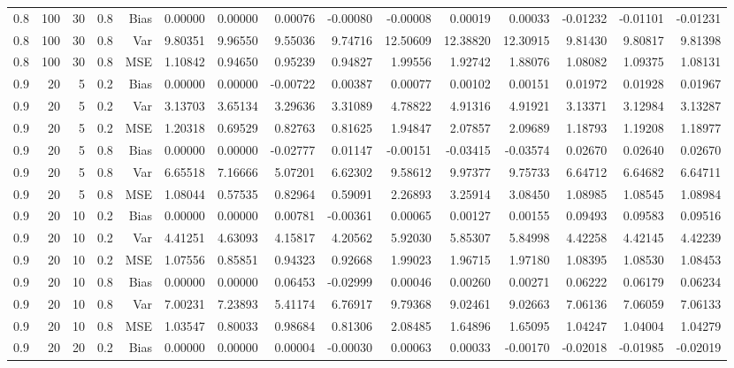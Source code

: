 \begin{table}[!htbp]
\begin{tabular}{lrrrrrrrrrrrrrr}
0.8 & 100 & 30 & 0.8 & Bias & 0.00000 & 0.00000 & 0.00076 & -0.00080 & -0.00008 & 0.00019 & 0.00033 & -0.01232 & -0.01101 & -0.01231 \\
0.8 & 100 & 30 & 0.8 & Var & 9.80351 & 9.96550 & 9.55036 & 9.74716 & 12.50609 & 12.38820 & 12.30915 & 9.81430 & 9.80817 & 9.81398 \\
0.8 & 100 & 30 & 0.8 & MSE & 1.10842 & 0.94650 & 0.95239 & 0.94827 & 1.99556 & 1.92742 & 1.88076 & 1.08082 & 1.09375 & 1.08131 \\
0.9 &  20 &  5 & 0.2 & Bias & 0.00000 & 0.00000 & -0.00722 & 0.00387 & 0.00077 & 0.00102 & 0.00151 & 0.01972 & 0.01928 & 0.01967 \\
0.9 &  20 &  5 & 0.2 & Var & 3.13703 & 3.65134 & 3.29636 & 3.31089 & 4.78822 & 4.91316 & 4.91921 & 3.13371 & 3.12984 & 3.13287 \\
0.9 &  20 &  5 & 0.2 & MSE & 1.20318 & 0.69529 & 0.82763 & 0.81625 & 1.94847 & 2.07857 & 2.09689 & 1.18793 & 1.19208 & 1.18977 \\
0.9 &  20 &  5 & 0.8 & Bias & 0.00000 & 0.00000 & -0.02777 & 0.01147 & -0.00151 & -0.03415 & -0.03574 & 0.02670 & 0.02640 & 0.02670 \\
0.9 &  20 &  5 & 0.8 & Var & 6.65518 & 7.16666 & 5.07201 & 6.62302 & 9.58612 & 9.97377 & 9.75733 & 6.64712 & 6.64682 & 6.64711 \\
0.9 &  20 &  5 & 0.8 & MSE & 1.08044 & 0.57535 & 0.82964 & 0.59091 & 2.26893 & 3.25914 & 3.08450 & 1.08985 & 1.08545 & 1.08984 \\
0.9 &  20 & 10 & 0.2 & Bias & 0.00000 & 0.00000 & 0.00781 & -0.00361 & 0.00065 & 0.00127 & 0.00155 & 0.09493 & 0.09583 & 0.09516 \\
0.9 &  20 & 10 & 0.2 & Var & 4.41251 & 4.63093 & 4.15817 & 4.20562 & 5.92030 & 5.85307 & 5.84998 & 4.42258 & 4.42145 & 4.42239 \\
0.9 &  20 & 10 & 0.2 & MSE & 1.07556 & 0.85851 & 0.94323 & 0.92668 & 1.99023 & 1.96715 & 1.97180 & 1.08395 & 1.08530 & 1.08453 \\
0.9 &  20 & 10 & 0.8 & Bias & 0.00000 & 0.00000 & 0.06453 & -0.02999 & 0.00046 & 0.00260 & 0.00271 & 0.06222 & 0.06179 & 0.06234 \\
0.9 &  20 & 10 & 0.8 & Var & 7.00231 & 7.23893 & 5.41174 & 6.76917 & 9.79368 & 9.02461 & 9.02663 & 7.06136 & 7.06059 & 7.06133 \\
0.9 &  20 & 10 & 0.8 & MSE & 1.03547 & 0.80033 & 0.98684 & 0.81306 & 2.08485 & 1.64896 & 1.65095 & 1.04247 & 1.04004 & 1.04279 \\
0.9 &  20 & 20 & 0.2 & Bias & 0.00000 & 0.00000 & 0.00004 & -0.00030 & 0.00063 & 0.00033 & -0.00170 & -0.02018 & -0.01985 & -0.02019 \\

\end{tabular}
\end{table}

